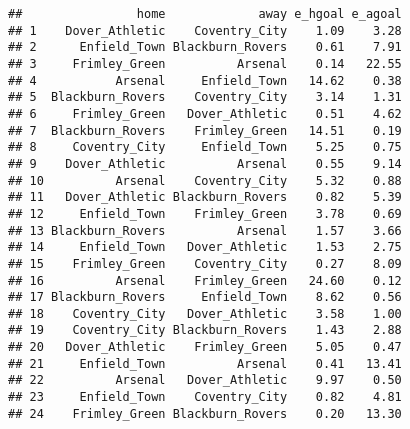 \documentclass[]{article}
\newenvironment{Shaded}{\begin{snugshade}}{\end{snugshade}}
\newcommand{\KeywordTok}[1]{\textcolor[rgb]{0.13,0.29,0.53}{\textbf{#1}}}
\newcommand{\DataTypeTok}[1]{\textcolor[rgb]{0.13,0.29,0.53}{#1}}
\newcommand{\DecValTok}[1]{\textcolor[rgb]{0.00,0.00,0.81}{#1}}
\newcommand{\StringTok}[1]{\textcolor[rgb]{0.31,0.60,0.02}{#1}}
\newcommand{\CommentTok}[1]{\textcolor[rgb]{0.56,0.35,0.01}{\textit{#1}}}
\newcommand{\OperatorTok}[1]{\textcolor[rgb]{0.81,0.36,0.00}{\textbf{#1}}}
\newcommand{\NormalTok}[1]{#1}
\begin{document}
\begin{verbatim}
##                home             away e_hgoal e_agoal
## 1    Dover_Athletic    Coventry_City    1.09    3.28
## 2      Enfield_Town Blackburn_Rovers    0.61    7.91
## 3     Frimley_Green          Arsenal    0.14   22.55
## 4           Arsenal     Enfield_Town   14.62    0.38
## 5  Blackburn_Rovers    Coventry_City    3.14    1.31
## 6     Frimley_Green   Dover_Athletic    0.51    4.62
## 7  Blackburn_Rovers    Frimley_Green   14.51    0.19
## 8     Coventry_City     Enfield_Town    5.25    0.75
## 9    Dover_Athletic          Arsenal    0.55    9.14
## 10          Arsenal    Coventry_City    5.32    0.88
## 11   Dover_Athletic Blackburn_Rovers    0.82    5.39
## 12     Enfield_Town    Frimley_Green    3.78    0.69
## 13 Blackburn_Rovers          Arsenal    1.57    3.66
## 14     Enfield_Town   Dover_Athletic    1.53    2.75
## 15    Frimley_Green    Coventry_City    0.27    8.09
## 16          Arsenal    Frimley_Green   24.60    0.12
## 17 Blackburn_Rovers     Enfield_Town    8.62    0.56
## 18    Coventry_City   Dover_Athletic    3.58    1.00
## 19    Coventry_City Blackburn_Rovers    1.43    2.88
## 20   Dover_Athletic    Frimley_Green    5.05    0.47
## 21     Enfield_Town          Arsenal    0.41   13.41
## 22          Arsenal   Dover_Athletic    9.97    0.50
## 23     Enfield_Town    Coventry_City    0.82    4.81
## 24    Frimley_Green Blackburn_Rovers    0.20   13.30
\end{verbatim}

\begin{Shaded}
\end{Shaded}
\end{document}
